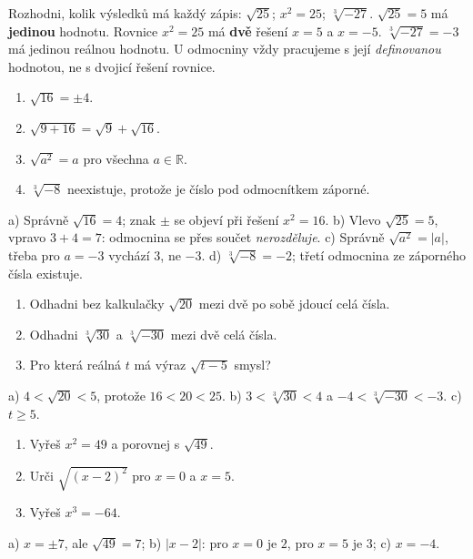 \documentclass[11pt,a4paper]{article}
\begin{document}
\begin{prikladReseniBox}[title={Příklad 3}]
Rozhodni, kolik výsledků má každý zápis:
$\sqrt{25}$; $x^2=25$; $\sqrt[3]{-27}$.
\tcblower
$\sqrt{25}=5$ má \textbf{jedinou} hodnotu.
Rovnice $x^2=25$ má \textbf{dvě} řešení $x=5$ a $x=-5$.
$\sqrt[3]{-27}=-3$ má jedinou reálnou hodnotu.
U odmocniny vždy pracujeme s její \emph{definovanou} hodnotou, ne s dvojicí řešení rovnice.
\end{prikladReseniBox}
\begin{zadaniReseniBox}[title={Samostatná práce 3}]
\begin{enumerate}[label=\alph*)]
\item $\sqrt{16}=\pm4$.
\item $\sqrt{9+16}=\sqrt9+\sqrt{16}$.
\item $\sqrt{a^2}=a$ pro všechna $a\in\mathbb R$.
\item $\sqrt[3]{-8}$ neexistuje, protože je číslo pod odmocnítkem záporné.
\end{enumerate}
\tcblower
 a) Správně $\sqrt{16}=4$; znak $\pm$ se objeví při řešení $x^2=16$.
 b) Vlevo $\sqrt{25}=5$, vpravo $3+4=7$: odmocnina se přes součet \emph{nerozděluje}.
 c) Správně $\sqrt{a^2}=|a|$, třeba pro $a=-3$ vychází $3$, ne $-3$.
 d) $\sqrt[3]{-8}=-2$; třetí odmocnina ze záporného čísla existuje.
\end{zadaniReseniBox}

\begin{zadaniReseniBox}[title={Rozšíření 1}]
\begin{enumerate}[label=\alph*)]
\item Odhadni bez kalkulačky $\sqrt{20}$ mezi dvě po sobě jdoucí celá čísla.
\item Odhadni $\sqrt[3]{30}$ a $\sqrt[3]{-30}$ mezi dvě celá čísla.
\item Pro která reálná $t$ má výraz $\sqrt{t-5}$ smysl?
\end{enumerate}
\tcblower
 a) $4<\sqrt{20}<5$, protože $16<20<25$.
 b) $3<\sqrt[3]{30}<4$ a $-4<\sqrt[3]{-30}<-3$.
 c) $t\ge5$.
\end{zadaniReseniBox}
\begin{zadaniReseniBox}[title={Rozšíření 2}]
\begin{enumerate}[label=\alph*)]
\item Vyřeš $x^2=49$ a porovnej s $\sqrt{49}$.
\item Urči $\sqrt{(x-2)^2}$ pro $x=0$ a $x=5$.
\item Vyřeš $x^3=-64$.
\end{enumerate}
\tcblower
 a) $x=\pm7$, ale $\sqrt{49}=7$;
 b) $|x-2|$: pro $x=0$ je $2$, pro $x=5$ je $3$;
 c) $x=-4$.
\end{zadaniReseniBox}
\end{document}
